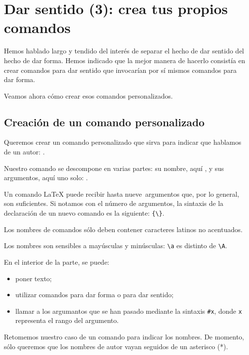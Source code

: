 \chapter{Dar sentido (3): crea tus propios comandos}\label{creercommandes}

\begin{intro}
Hemos hablado largo y tendido del interés de separar el hecho de dar sentido del hecho de dar forma.
Hemos indicado que la mejor manera de hacerlo consistía en crear comandos para dar sentido que invocarían por sí mismos comandos para dar forma.

Veamos ahora cómo crear esos comandos personalizados.
\end{intro}

\section{Creación de un comando personalizado}

Queremos crear un comando personalizado que sirva para indicar que hablamos de un autor: .

Nuestro comando se descompone en varias partes: su nombre, aquí , y sus argumentos, aquí uno solo: .

Un comando LaTeX puede recibir hasta nueve~argumentos que, por lo general, son suficientes. Si notamos con  el número de argumentos, la sintaxis de la declaración de un nuevo comando es la siguiente:
\verb|{\|\verb|}|.

\begin{attention}
   Los nombres de comandos sólo deben contener caracteres latinos no acentuados. 
    
    Los nombres son sensibles a mayúsculas y minúsculas: \verb|\a| es distinto de \verb|\A|.
\end{attention}
En el interior de la parte, se puede:
\begin{itemize}
    \item poner texto;
    \item utilizar comandos para dar forma o para dar sentido;
    \item llamar a los argumantos que se han pasado mediante la sintaxis \verb|#x|, donde \verb|x| representa el rango del argumento.
\end{itemize}

Retomemos nuestro caso de un comando para indicar los nombres. De momento, sólo queremos que los nombres de autor vayan seguidos de un asterisco (*).

